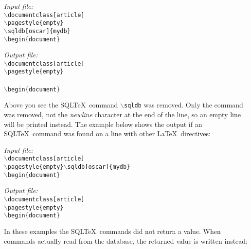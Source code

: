 \documentclass{article}
\newcommand{\bs}{\ensuremath{\backslash}}
\newcommand{\vs}{\vspace{3mm}}
\begin{document}
\begin{minipage}[t]{0.5\textwidth}\textsl{Input file:}\\\texttt{\footnotesize{\bs documentclass[article] \\
\bs pagestyle\{empty\} \\
\bs sqldb[oscar]\{mydb\} \\
\bs begin\{document\} \\
}}\end{minipage}\hfill\begin{minipage}[t]{0.5\textwidth}\textsl{Output file:}\\\texttt{\footnotesize{\bs documentclass[article] \\
\bs pagestyle\{empty\} \\
 \\
\bs begin\{document\} \\
}}\end{minipage}

\vs

Above you see the SQL\TeX\ command \texttt{\bs sqldb} was removed. Only the command was removed, not
the \textsl{newline} character at the end of the line, so an empty line will be printed instead.
The example below shows the output if an SQL\TeX\ command was found on a line with other \LaTeX\
directives:

\vs

\begin{minipage}[t]{0.5\textwidth}\textsl{Input file:}\\\texttt{\footnotesize{\bs documentclass[article] \\
\bs pagestyle\{empty\}\bs sqldb[oscar]\{mydb\} \\
\bs begin\{document\} \\
\hrulefill}}\end{minipage}\hfill\begin{minipage}[t]{0.5\textwidth}\textsl{Output file:}\\\texttt{\footnotesize{\bs documentclass[article] \\
\bs pagestyle\{empty\} \\
\bs begin\{document\} \\
}}\end{minipage}

\vs

In these examples the SQL\TeX\ commands did not return a value. When commands actually read from
the database, the returned value is written instead:

\vs
\end{document}
